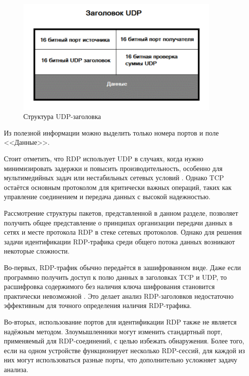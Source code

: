 \documentclass[spec, och, diploma]{SCWorks}
\begin{document}
\begin{figure}[H]
  \centering
  \includegraphics[width=0.9\textwidth]{pics/udp-segment.png}
  \caption{Структура UDP-заголовка}
  \label{udp-header}
\end{figure}

Из полезной информации можно выделить только номера портов и поле <<Данные>>.

Стоит отметить, что RDP использует UDP в случаях, когда нужно минимизировать задержки и повысить производительность, особенно для мультимедийных 
задач или нестабильных сетевых условий \cite{udpseg}. Однако TCP остаётся основным протоколом для критически важных операций, таких как 
управление соединением и передача данных с высокой надежностью.

Рассмотрение структуры пакетов, представленной в данном разделе, позволяет получить общее представление о принципах организации передачи данных в сетях и месте 
протокола RDP в стеке сетевых протоколов. Однако для решения задачи идентификации RDP-трафика среди общего потока данных возникают некоторые сложности.

Во-первых, RDP-трафик обычно передаётся в зашифрованном виде. Даже если программно получить доступ к полю данных в заголовках TCP и UDP, то расшифровка 
содержимого без наличия ключа шифрования становится практически невозможной \cite{lib5}. Это делает анализ RDP-заголовков недостаточно эффективным для точного 
определения наличия RDP-трафика.

Во-вторых, использование портов для идентификации RDP также не является надёжным методом. Злоумышленники могут изменить стандартный порт, 
применяемый для RDP-соединений, с целью избежать обнаружения. Более того, если на одном устройстве функционирует несколько RDP-сессий, для каждой 
из них могут использоваться разные порты, что дополнительно усложняет задачу анализа.
\end{document}
